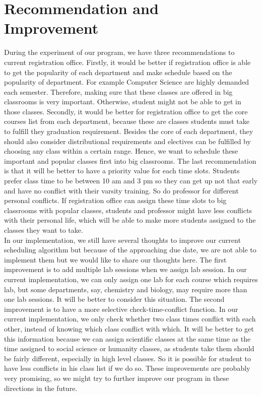 \documentclass[11pt, oneside]{article}   	%
\begin{document}
\section{Recommendation and Improvement}
During the experiment of our program, we have three recommendations to current registration office. Firstly, it would be better if registration office is able to get the popularity of each department and make schedule based on the popularity of department. For example Computer Science are highly demanded each semester. Therefore, making sure that these classes are offered in big classrooms is very important. Otherwise, student might not be able to get in those classes. Secondly, it would be better for registration office to get the core courses list from each department, because these are classes students must take to fulfill they graduation requirement. Besides the core of each department, they should also consider distributional requirements and electives can be fulfilled by choosing any class within a certain range.  Hence, we want to schedule these important and popular classes first into big classrooms. The last recommendation is that it will be better to have a priority value for each time slots. Students prefer class time to be between 10 am and 3 pm so they can get up not that early and have no conflict with their varsity training. So do professor for different personal conflicts. If registration office can assign these time slots to big classrooms with popular classes, students and professor might have less conflicts with their personal life, which will be able to make more students assigned to the classes they want to take.
\\In our implementation, we still have several thoughts to improve our current scheduling algorithm but because of the approaching due date, we are not able to implement them but we would like to share our thoughts here. The first improvement is to add multiple lab sessions when we assign lab session. In our current implementation, we can only assign one lab for each course which requires lab, but some departments, say, chemistry and biology, may require more than one lab sessions. It will be better to consider this situation. The second improvement is to have a more selective check-time-conflict function. In our current implementation, we only check whether two class times conflict with each other, instead of knowing which class conflict with which. It will be better to get this information because we can assign scientific classes at the same time as the time assigned to social science or humanity classes, as students take them should be fairly different, especially in high level classes. So it is possible for student to have less conflicts in his class list if we do so. These improvements are probably very promising, so we might try to further improve our program in these directions in the future.
\end{document}
